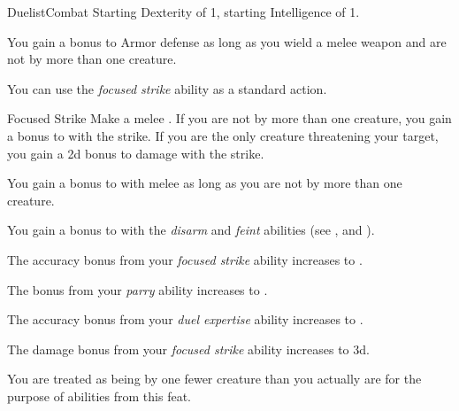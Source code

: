     \begin{feat}{Duelist}{Combat}
        \featpre Starting Dexterity of 1, starting Intelligence of 1.

         You gain a  bonus to Armor defense as long as you wield a melee weapon and are not  by more than one creature.

         You can use the \textit{focused strike} ability as a standard action.
        \begin{apability}{Focused Strike}
            Make a melee .
            If you are not  by more than one creature, you gain a  bonus to  with the strike.
            If you are the only creature threatening your target, you gain a \plus2d bonus to damage with the strike.
        \end{apability}

         You gain a  bonus to  with melee  as long as you are not  by more than one creature.

         You gain a  bonus to  with the \textit{disarm} and \textit{feint} abilities (see , and ).

         The accuracy bonus from your \textit{focused strike} ability increases to .

         The bonus from your \textit{parry} ability increases to .

         The accuracy bonus from your \textit{duel expertise} ability increases to .

         The damage bonus from your \textit{focused strike} ability increases to \plus3d.

         You are treated as being  by one fewer creature than you actually are for the purpose of abilities from this feat.
    \end{feat}

